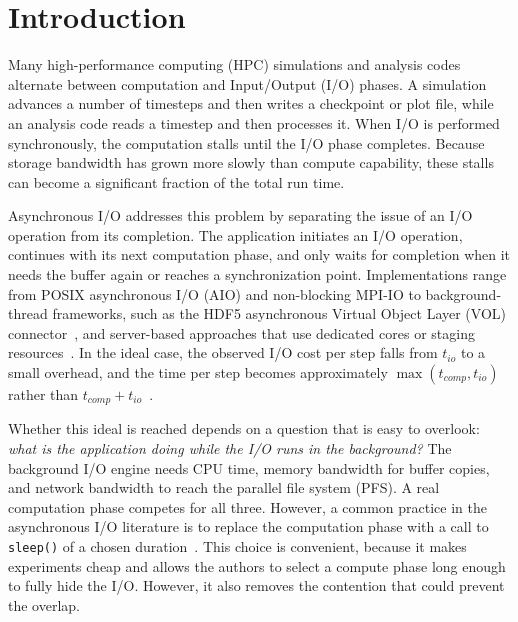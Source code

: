 \section{Introduction}
\label{sec:intro}

Many high-performance computing (HPC) simulations and analysis codes
alternate between computation and Input/Output (I/O) phases. A simulation
advances a number of timesteps and then writes a checkpoint or plot file,
while an analysis code reads a timestep and then processes it. When I/O is
performed synchronously, the computation stalls until the I/O phase
completes. Because storage bandwidth has grown more slowly than compute
capability, these stalls can become a significant fraction of the total run
time.

Asynchronous I/O addresses this problem by separating the issue of an I/O
operation from its completion. The application initiates an I/O operation,
continues with its next computation phase, and only waits for completion
when it needs the buffer again or reaches a synchronization point.
Implementations range from POSIX asynchronous I/O (AIO) and non-blocking
MPI-IO to background-thread frameworks, such as the HDF5 asynchronous
Virtual Object Layer (VOL) connector~\cite{tang2019async,tang2022async}, and
server-based approaches that use dedicated cores or staging
resources~\cite{dorier2016damaris}. In the ideal case, the observed I/O cost
per step falls from $t_{io}$ to a small overhead, and the time per step
becomes approximately $\max(t_{comp}, t_{io})$ rather than
$t_{comp} + t_{io}$~\cite{ravi2023evaluating}.

Whether this ideal is reached depends on a question that is easy to
overlook: \emph{what is the application doing while the I/O runs in the
background?} The background I/O engine needs CPU time, memory bandwidth for
buffer copies, and network bandwidth to reach the parallel file system (PFS).
A real computation phase competes for all three. However, a common practice
in the asynchronous I/O literature is to replace the computation phase with
a call to \texttt{sleep()} of a chosen
duration~\cite{li2021h5bench,tang2022async,ravi2023evaluating}. This choice
is convenient, because it makes experiments cheap and allows the authors to
select a compute phase long enough to fully hide the I/O. However, it also
removes the contention that could prevent the overlap.

